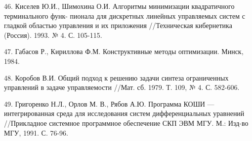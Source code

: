 \documentclass[10pt]{article}
\begin{document}
46. Киселев Ю.И., Шимохина О.И. Алгоритмы минимизации квадратичного терминального функ- пионала для дискретных линейных управляемых систем с гладкой областью управления и их приложения //Техническая кибернетика (Россия). 1993. № 4. С. 105-115.

47. Габасов Р., Кириллова Ф.М. Конструктивные методы оптимизации. Минск, 1984.

48. Коробов В.И. Общий подход к решению задачи синтеза ограниченных управлений в задаче управляемости //Мат. сб. 1979. Т. 109, № 4. С. 582-606.

49. Григоренко Н.Л., Орлов М. В., Рябов А.Ю. Программа КОШИ — интегрированная среда для исследования систем дифференциальных уравнений //Прикладное системное программное обеспечение СКП ЭВМ МГУ. М.: Изд-во МГУ, 1991. С. 76-96.
\end{document}

